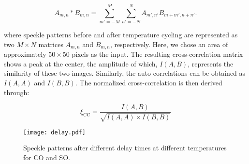 \documentclass[aps,prl,showpacs,floatfix,onecolumn,superscriptaddress,longbibliography,notitlepage]{revtex4-1}
\begin{document}
\begin{equation}
    A_{m,n} \ast B_{m,n} = \sum\limits_{m' = -M}^{M}\sum\limits_{n' = -N}^{N} A_{m',n'} B_{m+m', n+n'}.
    \label{eq:cross-correlation}
\end{equation}

\noindent where speckle patterns before and after temperature cycling are represented as two $M \times N$ matrices $A_{m,n}$ and $B_{m,n}$, respectively. Here, we chose an area of approximately $50 \times 50$ pixels as the input. The resulting cross-correlation matrix shows a peak at the center, the amplitude of which, $I(A, B)$, represents the similarity of these two images. Similarly, the auto-correlations can be obtained as $I(A, A)$ and $I(B, B)$. The normalized cross-correlation is then derived through:

\begin{equation}
    \xi_{\mathrm{CC}} = \frac{I(A, B)}{\sqrt{I(A, A) \times I(B, B)}}
    \label{eq:norm_cross-correlation}
\end{equation}


\begin{figure}
\texttt{[image: delay.pdf]}
\caption{Speckle patterns after different delay times at different temperatures for \gls{CO} and \gls{SO}.}
\end{figure}


\end{document}
